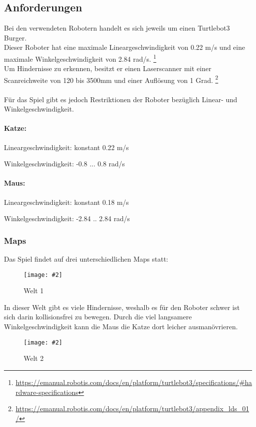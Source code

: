\documentclass[
a4paper,     %
12pt         %
]{scrartcl}  %
\newcommand{\mygraphics}[3]{
\begin{figure}[!h]
  \begin{center}
    \texttt{[image: \#2]} \\
    \caption{#3}\label{fig:#2}
  \end{center}
\end{figure}

}
\begin{document}
\subsection{Anforderungen}
Bei den verwendeten Robotern handelt es sich jeweils um einen Turtlebot3 Burger.\\ Dieser Roboter hat eine maximale Lineargeschwindigkeit von 0.22 m/s und eine maximale Winkelgeschwindigkeit von 2.84 rad/s. \footnote{\url{https://emanual.robotis.com/docs/en/platform/turtlebot3/specifications/\#hardware-specifications}}\\
Um Hindernisse zu erkennen, besitzt er einen Laserscanner mit einer Scanreichweite von 120 bis 3500mm und einer Auflösung von 1 Grad. \footnote{\url{https://emanual.robotis.com/docs/en/platform/turtlebot3/appendix_lds_01/}} \\\\
Für das Spiel gibt es jedoch Restriktionen der Roboter bezüglich Linear- und Winkelgeschwindigkeit.\\
\paragraph{Katze:}
\begin{description}
 \item Lineargeschwindigkeit: konstant 0.22 m/s
 \item Winkelgeschwindigkeit: -0.8 ... 0.8 rad/s
\end{description}	
\paragraph{Maus:}
\begin{description}
 \item Lineargeschwindigkeit: konstant 0.18 m/s
 \item Winkelgeschwindigkeit: -2.84 .. 2.84 rad/s
\end{description}
\clearpage
\subsubsection{Maps}
Das  Spiel findet auf drei unterschiedlichen Maps statt:
\mygraphics{0.5\textwidth}{Welt1.png}{Welt 1}

In dieser Welt gibt es viele Hindernisse, weshalb es für den Roboter schwer ist sich darin kollisionsfrei zu bewegen. Durch die viel langsamere Winkelgeschwindigkeit kann die Maus die Katze dort leicher ausmanövrieren.
\mygraphics{0.5\textwidth}{Welt2.png}{Welt 2}
\end{document}
